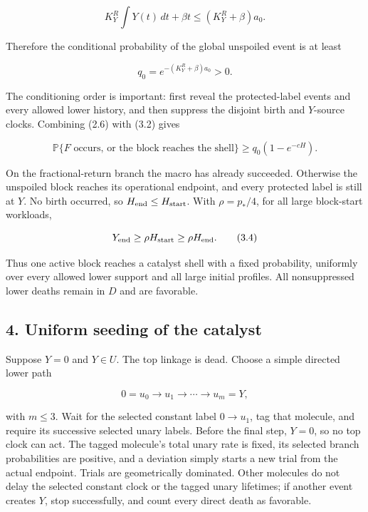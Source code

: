 \[
 K_Y^R\int Y(t)\,dt+\beta t
       \le(K_Y^R+\beta)a_0.                           \tag{3.1}
\]

Therefore the conditional probability of the global unspoiled event is
at least

\[
                         q_0=e^{-(K_Y^R+\beta)a_0}>0. \tag{3.2}
\]

The conditioning order is important: first reveal the protected-label
events and every allowed lower history, and then suppress the disjoint
birth and \(Y\)-source clocks. Combining (2.6) with (3.2) gives

\[
 \mathbb P\{F\text{ occurs, or the block reaches the shell}\}
                    \ge q_0(1-e^{-cH}).               \tag{3.3}
\]

On the fractional-return branch the macro has already succeeded.
Otherwise the unspoiled block reaches its operational endpoint, and
every protected label is still at \(Y\). No birth occurred, so
\(H_{\rm end}\le H_{\rm start}\). With \(\rho=p_*/4\), for all large
block-start workloads,

\[
                  Y_{\rm end}\ge\rho H_{\rm start}
                               \ge\rho H_{\rm end}.    \tag{3.4}
\]

Thus one active block reaches a catalyst shell with a fixed probability,
uniformly over every allowed lower support and all large initial
profiles. All nonsuppressed lower deaths remain in \(D\) and are
favorable.

\subsection{4. Uniform seeding of the
catalyst}

Suppose \(Y=0\) and \(Y\in U\). The top linkage is dead. Choose a simple
directed lower path

\[
                         0=u_0\longrightarrow u_1
                           \longrightarrow\cdots\longrightarrow u_m=Y,
                                                               \tag{4.1}
\]

with \(m\le3\). Wait for the selected constant label \(0\to u_1\), tag
that molecule, and require its successive selected unary labels. Before
the final step, \(Y=0\), so no top clock can act. The tagged molecule's
total unary rate is fixed, its selected branch probabilities are
positive, and a deviation simply starts a new trial from the actual
endpoint. Trials are geometrically dominated. Other molecules do not
delay the selected constant clock or the tagged unary lifetimes; if
another event creates \(Y\), stop successfully, and count every direct
death as favorable.

